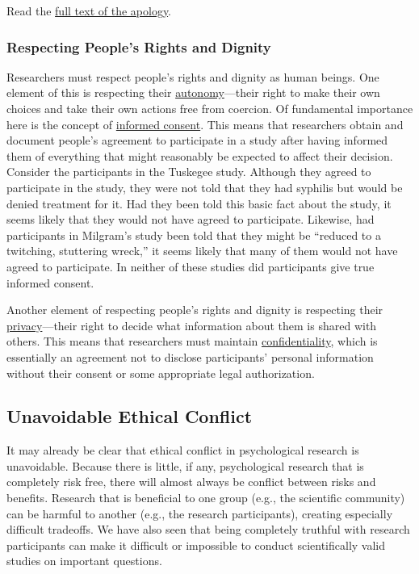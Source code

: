 \documentclass[
]{krantz}
\begin{document}
Read the \href{https://clintonwhitehouse4.archives.gov/textonly/New/Remarks/Fri/19970516-898.html}{full text of the apology}.

\hypertarget{respecting-peoples-rights-and-dignity}{%
\subsubsection*{Respecting People's Rights and Dignity}\label{respecting-peoples-rights-and-dignity}}


Researchers must respect people's rights and dignity as human beings. One element of this is respecting their \protect\hyperlink{autonomy}{autonomy}---their right to make their own choices and take their own actions free from coercion. Of fundamental importance here is the concept of \protect\hyperlink{informed-consent-1}{informed consent}. This means that researchers obtain and document people's agreement to participate in a study after having informed them of everything that might reasonably be expected to affect their decision. Consider the participants in the Tuskegee study. Although they agreed to participate in the study, they were not told that they had syphilis but would be denied treatment for it. Had they been told this basic fact about the study, it seems likely that they would not have agreed to participate. Likewise, had participants in Milgram's study been told that they might be ``reduced to a twitching, stuttering wreck,'' it seems likely that many of them would not have agreed to participate. In neither of these studies did participants give true informed consent.

Another element of respecting people's rights and dignity is respecting their \protect\hyperlink{privacy}{privacy}---their right to decide what information about them is shared with others. This means that researchers must maintain \protect\hyperlink{confidentiality}{confidentiality}, which is essentially an agreement not to disclose participants' personal information without their consent or some appropriate legal authorization.

\hypertarget{unavoidable-ethical-conflict}{%
\subsection*{Unavoidable Ethical Conflict}\label{unavoidable-ethical-conflict}}


It may already be clear that ethical conflict in psychological research is unavoidable. Because there is little, if any, psychological research that is completely risk free, there will almost always be conflict between risks and benefits. Research that is beneficial to one group (e.g., the scientific community) can be harmful to another (e.g., the research participants), creating especially difficult tradeoffs. We have also seen that being completely truthful with research participants can make it difficult or impossible to conduct scientifically valid studies on important questions.
\end{document}
